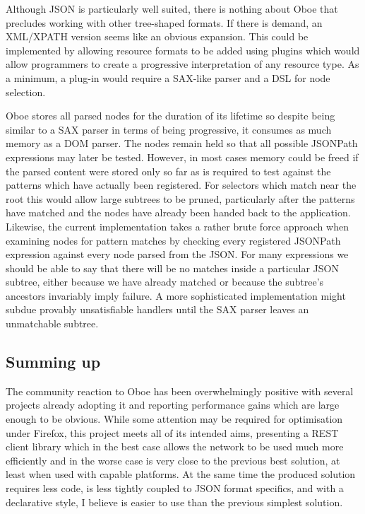 \documentclass[12pt, ]{article}
\begin{document}
Although JSON is particularly well suited, there is nothing about Oboe
that precludes working with other tree-shaped formats. If there is
demand, an XML/XPATH version seems like an obvious expansion. This could
be implemented by allowing resource formats to be added using plugins
which would allow programmers to create a progressive interpretation of
any resource type. As a minimum, a plug-in would require a SAX-like
parser and a DSL for node selection.

Oboe stores all parsed nodes for the duration of its lifetime so despite
being similar to a SAX parser in terms of being progressive, it consumes
as much memory as a DOM parser. The nodes remain held so that all
possible JSONPath expressions may later be tested. However, in most
cases memory could be freed if the parsed content were stored only so
far as is required to test against the patterns which have actually been
registered. For selectors which match near the root this would allow
large subtrees to be pruned, particularly after the patterns have
matched and the nodes have already been handed back to the application.
Likewise, the current implementation takes a rather brute force approach
when examining nodes for pattern matches by checking every registered
JSONPath expression against every node parsed from the JSON. For many
expressions we should be able to say that there will be no matches
inside a particular JSON subtree, either because we have already matched
or because the subtree's ancestors invariably imply failure. A more
sophisticated implementation might subdue provably unsatisfiable
handlers until the SAX parser leaves an unmatchable subtree.

\subsection{Summing up}\label{summing-up}

The community reaction to Oboe has been overwhelmingly positive with
several projects already adopting it and reporting performance gains
which are large enough to be obvious. While some attention may be
required for optimisation under Firefox, this project meets all of its
intended aims, presenting a REST client library which in the best case
allows the network to be used much more efficiently and in the worse
case is very close to the previous best solution, at least when used
with capable platforms. At the same time the produced solution requires
less code, is less tightly coupled to JSON format specifics, and with a
declarative style, I believe is easier to use than the previous simplest
solution.
\end{document}
